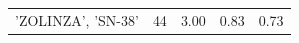 \begin{center}
\begin{longtable}{@{}lcccc@{}}
    'ZOLINZA', 'SN-38' & 44 & 3.00 & 0.83 & 0.73 \\
\end{longtable}
\end{center}

\newpage %

